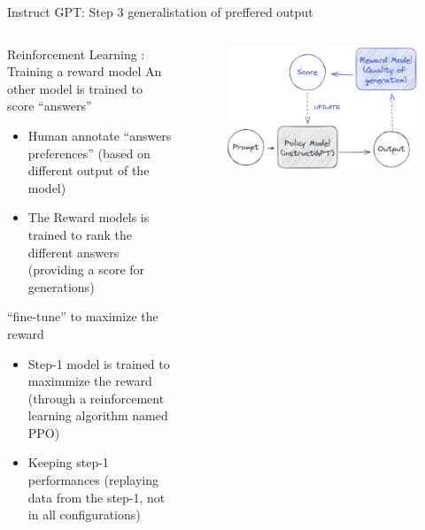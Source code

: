 \documentclass[10pt,aspectratio=169]{beamer}
\begin{document}
\begin{frame}{Instruct GPT: Step 3 generalistation of preffered output}

    \begin{columns}
        \begin{column}{0.5\textwidth}
            \begin{alertblock}{Reinforcement Learning : Training a reward model}
            \footnotesize
                An other model is trained to score ``answers''
                \begin{itemize}
                    \item Human annotate ``answers preferences'' (based on different output of the model)
                    \item The Reward models is trained to rank the different answers (providing a score for generations)
                \end{itemize}

            \end{alertblock}
            \begin{alertblock}{``fine-tune'' to maximize the reward}
            \footnotesize
                \begin{itemize}
                    \item Step-1 model is trained to maximmize the reward (through a reinforcement learning algorithm named PPO) 
                    \item Keeping step-1 performances (replaying data from the step-1, not in all configurations)
                \end{itemize}

            \end{alertblock}

        \end{column}
        \begin{column}{0.6\textwidth}  %
            \begin{figure}
                \centering
                \includegraphics[width=.8\textwidth]{media/reinforcement-instruct(1).png}
                

\end{figure}
\end{column}
\end{columns}
\end{frame}
\end{document}

